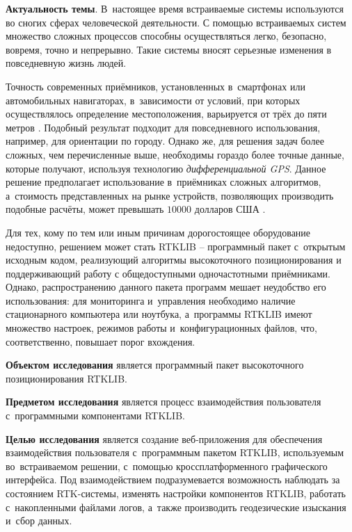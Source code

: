 
\textbf{Актуальность темы}. В~настоящее время встраиваемые системы используются во сногих сферах человеческой деятельности. С помощью встраиваемых систем множество сложных процессов способны осуществляться легко, безопасно, вовремя, точно и непрерывно. Такие системы вносят серьезные изменения в повседневную жизнь людей.

Точность современных приёмников, установленных в~смартфонах или автомобильных навигаторах, в~зависимости от условий, при которых осуществлялось определение местоположения, варьируется от трёх до пяти метров \cite{GpsAccuracy,GpsGlonassAccuracy}. Подобный результат подходит для повседневного использования, например, для ориентации по городу. Однако же, для решения задач более сложных, чем перечисленные выше, необходимы гораздо более точные данные, которые получают, используя технологию \textit{дифференциальной GPS}. Данное решение предполагает использование в~приёмниках сложных алгоритмов, а~стоимость представленных на рынке устройств, позволяющих производить подобные расчёты, может превышать $10000$ долларов США \cite{GEOOPTIC,JAVAD}.

Для тех, кому по тем или иным причинам дорогостоящее оборудование недоступно, решением может стать RTKLIB \cite{RTKLIB} -- программный пакет с~открытым исходным кодом, реализующий алгоритмы высокоточного позиционирования и поддерживающий работу с общедоступными одночастотными приёмниками. Однако, распространению данного пакета программ мешает неудобство его использования: для мониторинга и~управления необходимо наличие стационарного компьютера или ноутбука, а~программы RTKLIB имеют множество настроек, режимов работы и~конфигурационных файлов, что, соответственно, повышает порог вхождения.

\textbf{Объектом исследования} является программный пакет высокоточного позиционирования RTKLIB.

\textbf{Предметом исследования} является процесс взаимодействия пользователя с~программными компонентами RTKLIB.

\textbf{Целью исследования} является создание веб-приложения для обеспечения взаимодействия пользователя с~программным пакетом RTKLIB, используемым во~встраиваемом решении, с~помощью кроссплатформенного графического интерфейса. Под взаимодействием подразумевается возможность наблюдать за состоянием RTK-системы, изменять настройки компонентов RTKLIB, работать с~накопленными файлами логов, а~также производить геодезические изыскания и~сбор данных.

